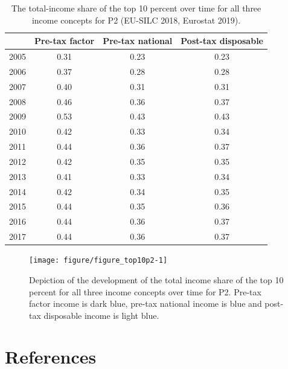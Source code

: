 \documentclass[a4paper]{article}\usepackage[]{graphicx}\usepackage[]{color}
\newenvironment{knitrout}{}{} %
\begin{document}
\begin{table}[ht]
\centering
\begin{tabular}{lccc}
  \toprule
 & Pre-tax factor & Pre-tax national & Post-tax disposable \\ 
  \midrule
2005 & 0.31 & 0.23 & 0.23 \\ 
  2006 & 0.37 & 0.28 & 0.28 \\ 
  2007 & 0.40 & 0.31 & 0.31 \\ 
  2008 & 0.46 & 0.36 & 0.37 \\ 
  2009 & 0.53 & 0.43 & 0.43 \\ 
  2010 & 0.42 & 0.33 & 0.34 \\ 
  2011 & 0.44 & 0.36 & 0.37 \\ 
  2012 & 0.42 & 0.35 & 0.35 \\ 
  2013 & 0.41 & 0.33 & 0.34 \\ 
  2014 & 0.42 & 0.34 & 0.35 \\ 
  2015 & 0.44 & 0.35 & 0.36 \\ 
  2016 & 0.44 & 0.36 & 0.37 \\ 
  2017 & 0.44 & 0.36 & 0.37 \\ 
   \bottomrule
\end{tabular}
\caption{The total-income share of the top 10 percent over time for all three income concepts for P2 (EU-SILC 2018, Eurostat 2019).} 
\label{top10p2}
\end{table}



\begin{knitrout}
\color{fgcolor}\begin{figure}[H]

{\centering \texttt{[image: figure/figure\_top10p2-1]} 

}

\caption[Depiction of the development of the total income share of the top 10 percent for all three income concepts over time for P2]{Depiction of the development of the total income share of the top 10 percent for all three income concepts over time for P2. Pre-tax factor income is dark blue, pre-tax national income is blue and post-tax disposable income is light blue.}\label{fig:figure_top10p2}
\end{figure}


\end{knitrout}

\section{References}
\printbibliography[heading=none]
\end{document}
